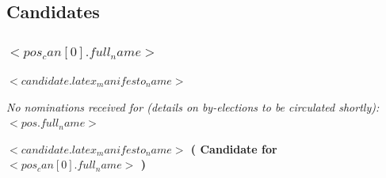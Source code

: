 \documentclass{header-footer}
\begin{document}
\subsection*{Candidates}

\subsubsection*{\hyperlink{$<{ pos_can[0].id }>$}{$<{pos_can[0].full_name}>$}}
\vspace{-5px}
\noindent\emph{$<{candidate.latex_manifesto_name}>$}
\vspace{-10px}

\vfill
\noindent\emph{No nominations received for (details on by-elections to be circulated shortly):}
\noindent $<{pos.full_name}>$
\vspace{20pt}

\break

\hypertarget{$<{ pos_can[0].id }>$}{}
\begin{minipage}{\linewidth}
\graphicspath{{./$<{candidate.manifesto_files_path}>$/}}

\begin{figure}
    \vspace{-\intextsep}
    \centering

\end{figure}
\textbf{$<{candidate.latex_manifesto_name}>$ (%
        Candidate%
        for $<{pos_can[0].full_name}>$%
)}

\end{minipage}
\vspace{4ex}
\end{document}
